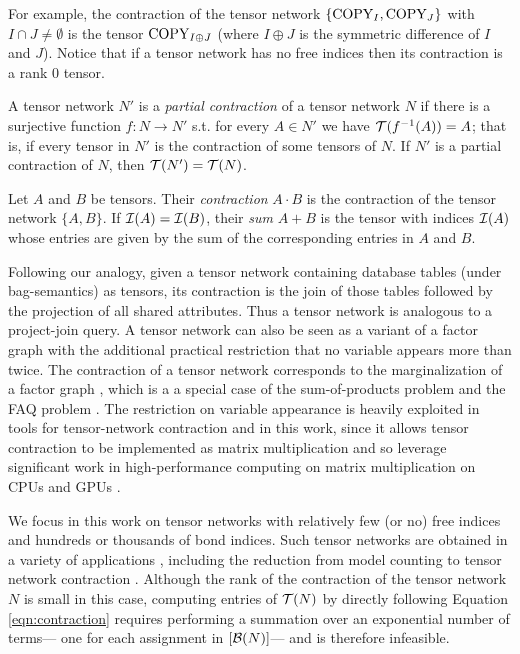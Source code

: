 For example, the contraction of the tensor network $\{\text{COPY}_I, \text{COPY}_J\}$ with $I \cap J \neq \emptyset$ is the tensor $\text{COPY}_{I \oplus J}$ (where $I \oplus J$ is the symmetric difference of $I$ and $J$). Notice that if a tensor network has no free indices then its contraction is a rank 0 tensor. 

A tensor network $N'$ is a \emph{partial contraction} of a tensor network $N$ if there is a surjective function $f: N \rightarrow N'$ s.t. for every $A \in N'$ we have $\mathcal{T}(f^{-1}(A)) = A$; that is, if every tensor in $N'$ is the contraction of some tensors of $N$. If $N'$ is a partial contraction of $N$, then $\mathcal{T}(N') = \mathcal{T}(N)$.

Let $A$ and $B$ be tensors. Their \emph{contraction} $A \cdot B$ is the contraction of the tensor network $\{A, B\}$. If $\mathcal{I}(A) = \mathcal{I}(B)$, their \emph{sum} $A+B$ is the tensor with indices $\mathcal{I}(A)$ whose entries are given by the sum of the corresponding entries in $A$ and $B$.

Following our analogy, given a tensor network containing database tables (under bag-semantics) as tensors, its contraction is the join of those tables followed by the projection of all shared attributes. Thus a tensor network is analogous to a project-join query. A tensor network can also be seen as a variant of a factor graph \cite{KFL01} with the additional practical restriction that no variable appears more than twice. The contraction of a tensor network corresponds to the marginalization of a factor graph \cite{RS17}, which is a a special case of the sum-of-products problem \cite{BDP09,dechter99} and the FAQ problem \cite{KNR16}. The restriction on variable appearance is heavily exploited in tools for tensor-network contraction and in this work, since it allows tensor contraction to be implemented as matrix multiplication and so leverage significant work in high-performance computing on matrix multiplication on CPUs \cite{LHKK77} and GPUs \cite{FSH04}.

We focus in this work on tensor networks with relatively few (or no) free indices and hundreds or thousands of bond indices. Such tensor networks are obtained in a variety of applications \cite{Cichocki14,DLVR18}, including the reduction from model counting to tensor network contraction \cite{BMT15}. Although the rank of the contraction of the tensor network $N$ is small in this case, computing entries of $\mathcal{T}(N)$ by
directly following Equation \ref{eqn:contraction} requires performing a summation over an exponential number of terms--- one for each assignment in $[\mathcal{B}(N)]$--- and is therefore infeasible.

